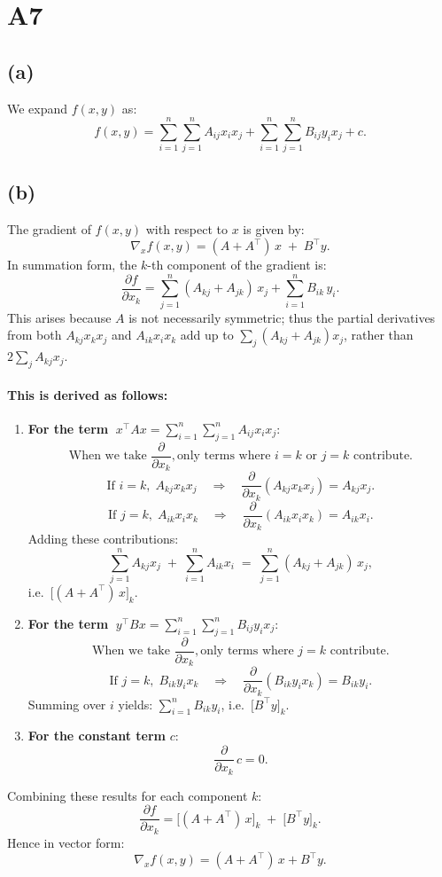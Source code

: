 \documentclass{article}
\begin{document}
\section*{A7}

\subsection*{(a)}
We expand \(f(x, y)\) as:
\[
f(x, y) = \sum_{i=1}^n \sum_{j=1}^n A_{ij} x_i x_j 
        + \sum_{i=1}^n \sum_{j=1}^n B_{ij} y_i x_j
        + c.
\]

\subsection*{(b)}
The gradient of \(f(x, y)\) with respect to \(x\) is given by:
\[
\nabla_x f(x, y) = (A + A^\top)\,x \;+\; B^\top y.
\]
In summation form, the \(k\)-th component of the gradient is:
\[
\frac{\partial f}{\partial x_k} 
= \sum_{j=1}^n (A_{kj} + A_{jk})\,x_j 
  + \sum_{i=1}^n B_{ik}\,y_i.
\]
This arises because \(A\) is not necessarily symmetric; thus the partial derivatives from both \(A_{kj} x_k x_j\) and \(A_{ik} x_i x_k\) add up to \(\sum_j (A_{kj} + A_{jk}) x_j\), rather than \(2 \sum_j A_{kj} x_j\).

\paragraph{This is derived as follows:}
\begin{enumerate}
\item \textbf{For the term} \(\;x^\top A x = \sum_{i=1}^n \sum_{j=1}^n A_{ij} x_i x_j\):
  \[
  \text{When we take } \frac{\partial}{\partial x_k}, 
  \text{only terms where } i = k \text{ or } j = k \text{ contribute.}
  \]
  \[
  \text{If } i = k,\; A_{kj} x_k x_j 
    \quad\Longrightarrow\quad 
    \frac{\partial}{\partial x_k}(A_{kj} x_k x_j) = A_{kj} x_j.
  \]
  \[
  \text{If } j = k,\; A_{ik} x_i x_k 
    \quad\Longrightarrow\quad 
    \frac{\partial}{\partial x_k}(A_{ik} x_i x_k) = A_{ik} x_i.
  \]
  Adding these contributions:
  \[
    \sum_{j=1}^n A_{kj} x_j \;+\; \sum_{i=1}^n A_{ik} x_i 
    \;=\; \sum_{j=1}^n (A_{kj} + A_{jk})\,x_j,
  \]
  i.e.\ \(\bigl[(A + A^\top)\,x\bigr]_k\).

\item \textbf{For the term} \(\;y^\top B x = \sum_{i=1}^n \sum_{j=1}^n B_{ij} y_i x_j\):
  \[
  \text{When we take } \frac{\partial}{\partial x_k}, 
  \text{only terms where } j = k \text{ contribute.}
  \]
  \[
  \text{If } j = k,\; B_{ik} y_i x_k 
    \quad\Longrightarrow\quad 
    \frac{\partial}{\partial x_k}(B_{ik} y_i x_k) = B_{ik} y_i.
  \]
  Summing over \(i\) yields:
  \(\sum_{i=1}^n B_{ik} y_i\), i.e.\ \(\bigl[B^\top y\bigr]_k\).

\item \textbf{For the constant term} \(c\):
  \[
  \frac{\partial}{\partial x_k}\,c = 0.
  \]
\end{enumerate}
Combining these results for each component \(k\):
\[
\frac{\partial f}{\partial x_k} 
 = \bigl[(A + A^\top)\,x\bigr]_k \;+\; \bigl[B^\top y\bigr]_k.
\]
Hence in vector form:
\[
\nabla_x f(x, y) = (A + A^\top)\,x + B^\top y.
\]
\end{document}
